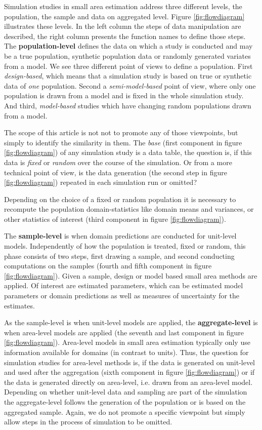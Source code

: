 \documentclass[article]{ajs}
\begin{document}
Simulation studies in small area estimation address three different levels, the population, the sample and data on aggregated level. Figure \ref{fig:flowdiagram} illustrates these levels. In the left column the steps of data manipulation are described, the right column presents the function names to define those steps. The \textbf{population-level} defines the data on which a study is conducted and may be a true population, synthetic population data or randomly generated variates from a model. We see three different point of views to define a population. First \textit{design-based}, which means that a simulation study is based on true or synthetic data of \textit{one} population. Second a \textit{semi-model-based} point of view, where only one population is drawn from a model and is fixed in the whole simulation study. And third, \textit{model-based} studies which have changing random populations drawn from a model.

The scope of this article is not not to promote any of those viewpoints, but simply to identify the similarity in them. The \textit{base} (first component in figure \ref{fig:flowdiagram}) of any simulation study is a data table, the question is, if this data is \textit{fixed} or \textit{random} over the course of the simulation. Or from a more technical point of view, is the data generation (the second step in figure \ref{fig:flowdiagram}) repeated in each simulation run or omitted?

Depending on the choice of a fixed or random population it is necessary to recompute the population domain-statistics like domain means and variances, or other statistics of interest (third component in figure \ref{fig:flowdiagram}).

The \textbf{sample-level} is when domain predictions are conducted for unit-level models. Independently of how the population is treated, fixed or random, this phase consists of two steps, first drawing a sample, and second conducting computations on the samples (fourth and fifth component in figure \ref{fig:flowdiagram}). Given a sample, design or model based small area methods are applied. Of interest are estimated parameters, which can be estimated model parameters or domain predictions as well as measures of uncertainty for the estimates.

As the sample-level is when unit-level models are applied, the \textbf{aggregate-level} is when area-level models are applied (the seventh and last component in figure \ref{fig:flowdiagram}). Area-level models in small area estimation typically only use information available for domains (in contrast to units). Thus, the question for simulation studies for area-level methods is, if the data is generated on unit-level and used after the aggregation (sixth component in figure \ref{fig:flowdiagram}) or if the data is generated directly on area-level, i.e. drawn from an area-level model. Depending on whether unit-level data and sampling are part of the simulation the aggregate-level follows the generation of the population or is based on the aggregated sample. Again, we do not promote a specific viewpoint but simply allow steps in the process of simulation to be omitted.
\end{document}
